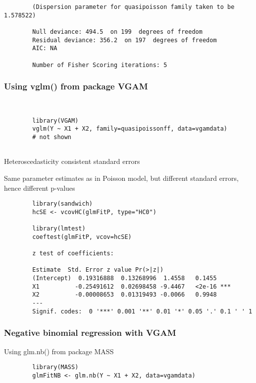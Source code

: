 \documentclass{beamer}
\begin{document}
	\begin{frame}[fragile]
		\begin{verbatim}
		(Dispersion parameter for quasipoisson family taken to be 1.578522)
		
		Null deviance: 494.5  on 199  degrees of freedom
		Residual deviance: 356.2  on 197  degrees of freedom
		AIC: NA
		
		Number of Fisher Scoring iterations: 5
		\end{verbatim}
	\end{frame}
	\begin{frame}[fragile]
	\frametitle{Using vglm() from package VGAM}
	\begin{verbatim}
		
		
		library(VGAM)
		vglm(Y ~ X1 + X2, family=quasipoissonff, data=vgamdata)
		# not shown
		
		\end{verbatim}
		
		
	\end{frame}
	\begin{frame}[fragile]
	Heteroscedasticity consistent standard errors
	
	Same parameter estimates as in Poisson model, but different standard errors, hence different p-values
	\end{frame}
	\begin{frame}[fragile]
		\begin{verbatim}
		library(sandwich)
		hcSE <- vcovHC(glmFitP, type="HC0")
		
		library(lmtest)
		coeftest(glmFitP, vcov=hcSE)
		
		z test of coefficients:
		
		Estimate  Std. Error z value Pr(>|z|)    
		(Intercept)  0.19316888  0.13268996  1.4558   0.1455    
		X1          -0.25491612  0.02698458 -9.4467   <2e-16 ***
		X2          -0.00008653  0.01319493 -0.0066   0.9948    
		---
		Signif. codes:  0 '***' 0.001 '**' 0.01 '*' 0.05 '.' 0.1 ' ' 1
		\end{verbatim}
	\end{frame}
	\begin{frame}[fragile]
		\frametitle{Negative binomial regression with VGAM}
		
		Using glm.nb() from package MASS
		\begin{verbatim}
		library(MASS)
		glmFitNB <- glm.nb(Y ~ X1 + X2, data=vgamdata)
		\end{verbatim}
	\end{frame}
\end{document}
